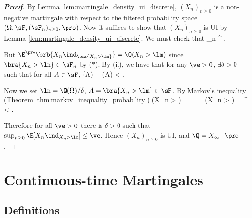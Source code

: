 \begin{proof}[\bf Proof]
By Lemma \ref{lem:martingale_density_ui_discrete}, $(X_n)_{n\geq 0}$ is a non-negative martingale with respect to the filtered probability space $(\Omega,\sF,(\sF_n)_{n\geq 0},\pro)$. Now it suffices to show that $(X_n)_{n\geq 0}$ is UI by Lemma \ref{lem:martingale_density_ui_discrete}. We must check that
\be
\sup_{n} \E^\pro{} \lm \to \infty.
\ee

But $\E^\pro\brb{X_n\ind_{\bra{X_n>\lm}}} = \Q(X_n > \lm)$ since ${\bra{X_n>\lm}}\in \sF_n$ by ($*$). By (ii), we have that for any $\ve>0$, $\exists \delta >0$ such that for all $A\in \sF$,
\be
\pro(A) \leq \delta \ \ra \ \Q(A) < \ve.
\ee

Now we set $\lm = \Q(\Omega)/\delta$, $A = \bra{X_n > \lm}\in \sF$. By Markov's inequality (Theorem \ref{thm:markov_inequality_probability})
\be
\pro(X_n > \lm) \leq {}  = \frac {\Q(\Omega)}{\lm} = \delta \ \ra \ \Q(X_n > \lm) = \E^\pro{} < \ve.
\ee


Therefore for all $\ve > 0$ there is $\delta > 0$ such that $\sup_{n\geq 0} \E[X_n\ind_{X_n>\lm}] \leq \ve$. Hence $(X_n)_{n\geq 0}$ is UI, and $\Q = X_\infty \cdot \pro$.
\end{proof}



\section{Continuous-time Martingales}

\subsection{Definitions}

